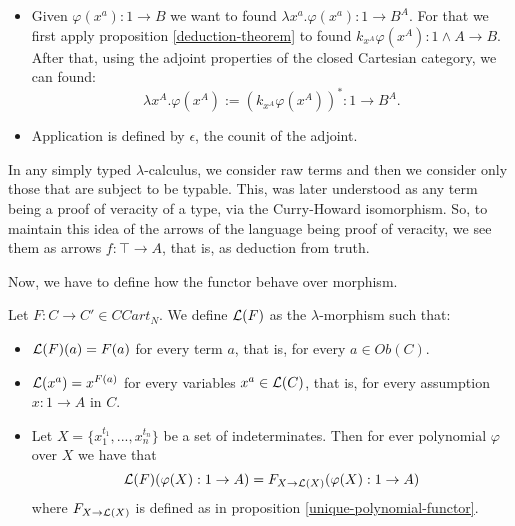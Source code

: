 \begin{definition}
\begin{itemize}
\begin{itemize}
    \item Given $\varphi(x^a):1 \to B$ we want to found $\lambda x^a.\varphi(x^a): 1 \to B^A$.  For that we first apply proposition \ref{deduction-theorem} to found $k_{x^A}\varphi(x^A): 1 \land A \to B$. After that, using the adjoint properties of the closed Cartesian category, we can found:
      $$\lambda x^A.\varphi(x^A) := \left( k_{x^A}\varphi(x^A)\right)^*: 1 \to B^A.$$
    \item Application is defined by $\epsilon$, the counit of the adjoint.
    \end{itemize}
  \end{itemize}

\end{definition}


\begin{remark}
  In any simply typed $\lambda$-calculus, we consider raw terms and then we consider only those that are subject to be typable. This, was later understood as any term being a proof of veracity of a type, via the Curry-Howard isomorphism. So, to maintain this idea of the arrows of the language being proof of veracity, we see them as arrows $f:\top \to A$, that is, as deduction from truth. \\
\end{remark}

Now, we have to define how the functor behave over morphism.

\begin{definition}
  Let $F:C\to C'\in CCart_N$. We define $\mathcal{L} (F)$ as the $\lambda$-morphism such that:
  \begin{itemize}
  \item $\mathcal{L} (F) (a)= F(a)$ for every term $a$, that is, for every $a\in Ob(C)$.
  \item $\mathcal{L} (x^a) = x^{F(a)}$ for every variables $x^a \in\mathcal{L}(C)$, that is, for every assumption $x: 1 \to A$ in $C$.
  \item Let $X= \{x_1^{t_1},...,x_n^{t_n}\}$ be a set of indeterminates. Then for ever polynomial $\varphi$ over $X$ we have that
    $$\mathcal{L}(F)(\varphi(X):1 \to A) = F_{X\to \mathcal{L}(X)}(\varphi(X):1 \to A)$$  where $F_{X\to \mathcal{L}(X)}$ is defined as in proposition \ref{unique-polynomial-functor}.
  \end{itemize}
\end{definition}

